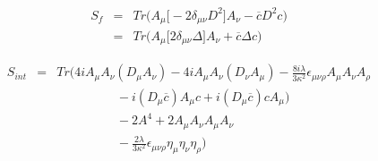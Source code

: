 \documentclass[10pt]{book}
\theoremstyle{break}
\begin{document}
\begin{eqnarray*}
 S_{f} &=& Tr \Bigg( A_\mu \bigg[ - 2 \delta_{\mu \nu} D^2  \bigg] A_\nu - \overline{c} D^2 c \Bigg) \nonumber \\
 &=& Tr \Bigg( A_\mu \bigg[ 2 \delta_{\mu \nu} \Delta \bigg] A_\nu + \overline{c} \Delta c \Bigg)
\end{eqnarray*}

\begin{eqnarray*}
 S_{int} &=& Tr \Bigg( 4i A_\mu A_\nu (D_\mu A_\nu) - 4i A_\mu A_\nu (D_\nu A_\mu) - \frac{8i\lambda}{3\kappa^2} \epsilon_{\mu \nu \rho} A_\mu A_\nu A_\rho \nonumber \\
 && \hspace{2cm} - i ( D_\mu \overline{c} ) A_\mu c + i ( D_\mu \overline{c} ) c A_\mu \big) \nonumber \\
 && \hspace{2cm} - 2 A^4 + 2 A_\mu A_\nu A_\mu A_\nu \nonumber \\ 
 && \hspace{2cm} - \frac{2 \lambda}{3 \kappa^2} \epsilon_{\mu \nu \rho} \eta_{\mu} \eta_\nu \eta_\rho \Bigg)
\end{eqnarray*}




\end{document}
